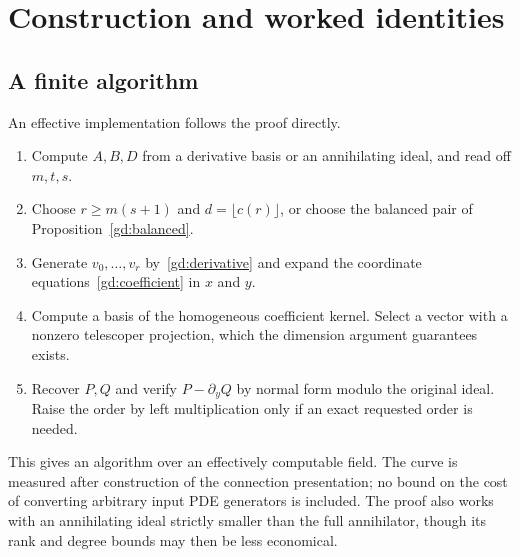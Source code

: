 \section{Construction and worked identities}
\subsection{A finite algorithm}
An effective implementation follows the proof directly.
\begin{enumerate}
\item Compute $A,B,D$ from a derivative basis or an annihilating ideal,
and read off $m,t,s$.
\item Choose $r\ge m(s+1)$ and $d=\lfloor c(r)\rfloor$, or choose the
balanced pair of Proposition~\ref{gd:balanced}.
\item Generate $v_0,\ldots,v_r$ by~\eqref{gd:derivative} and expand the
coordinate equations~\eqref{gd:coefficient} in $x$ and $y$.
\item Compute a basis of the homogeneous coefficient kernel. Select a
vector with a nonzero telescoper projection, which the dimension
argument guarantees exists.
\item Recover $P,Q$ and verify $P-\partial_yQ$ by normal form modulo
the original ideal. Raise the order by left multiplication only if
an exact requested order is needed.
\end{enumerate}
This gives an algorithm over an effectively computable field.
The curve is measured after construction of the connection presentation;
no bound on the cost of converting arbitrary input PDE generators is
included. The proof also works with an annihilating ideal strictly
smaller than the full annihilator, though its rank and degree bounds
may then be less economical.

